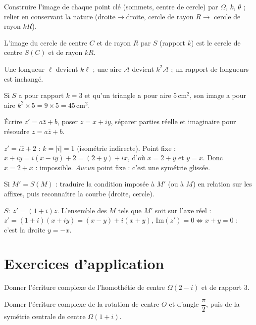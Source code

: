 Construire l'image de chaque point clé (sommets, centre de cercle) par $\Omega$, $k$, $\theta$ ; relier en
conservant la nature (droite$\to$droite, cercle de rayon $R\to$ cercle de rayon $kR$).
\begin{exemple}
L'image du cercle de centre $C$ et de rayon $R$ par $S$ (rapport $k$) est le cercle de centre $S(C)$ et de rayon $kR$.
\end{exemple}

Une longueur $\ell$ devient $k\ell$ ; une aire $\mathcal A$ devient $k^{2}\mathcal A$ ; un rapport de longueurs est inchangé.
\begin{exemple}
Si $S$ a pour rapport $k=3$ et qu'un triangle a pour aire $5\,\text{cm}^2$, son image a pour aire
$k^{2}\times5=9\times5=45\,\text{cm}^2$.
\end{exemple}

Écrire $z'=a\bar z+b$, poser $z=x+iy$, séparer parties réelle et imaginaire pour résoudre $z=a\bar z+b$.
\begin{exemple}
$z'=i\bar z+2$ : $k=|i|=1$ (isométrie indirecte). Point fixe : $x+iy=i(x-iy)+2=(2+y)+ix$, d'où
$x=2+y$ et $y=x$. Donc $x=2+x$ : impossible. \emph{Aucun} point fixe : c'est une symétrie glissée.
\end{exemple}

Si $M'=S(M)$ : traduire la condition imposée à $M'$ (ou à $M$) en relation sur les affixes, puis reconnaître
la courbe (droite, cercle).
\begin{exemple}
$S:\ z'=(1+i)z$. L'ensemble des $M$ tels que $M'$ soit sur l'axe réel : $z'=(1+i)(x+iy)=(x-y)+i(x+y)$,
$\mathrm{Im}(z')=0\iff x+y=0$ : c'est la droite $y=-x$.
\end{exemple}

\section{Exercices d'application}

\exo{} Donner l'écriture complexe de l'homothétie de centre $\Omega(2-i)$ et de rapport $3$.

\exo{} Donner l'écriture complexe de la rotation de centre $O$ et d'angle $\dfrac\pi2$, puis de la
symétrie centrale de centre $\Omega(1+i)$.

